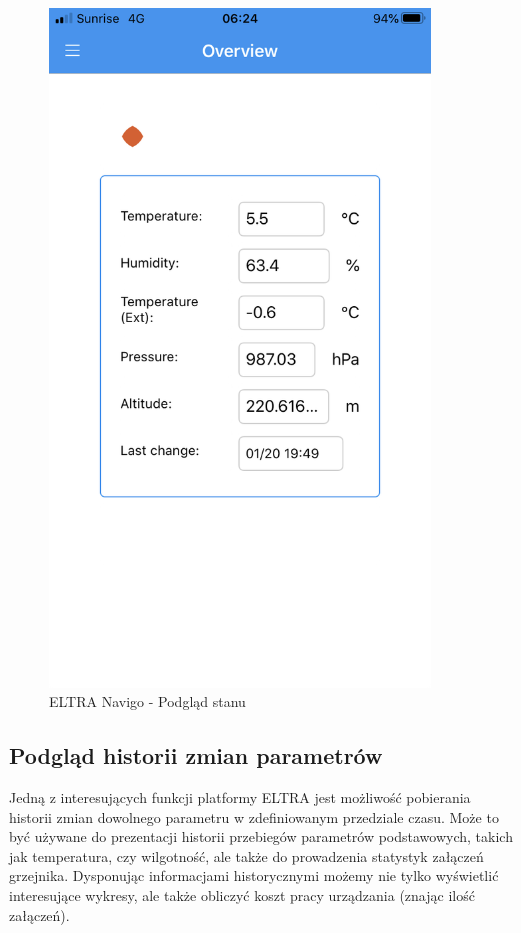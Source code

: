 \documentclass[a4paper,10pt]{article}
\begin{document}
\begin{figure}[H]
\begin{minipage}{0.45\textwidth}
        \includegraphics[width=0.9\textwidth]{navigo_overview.png}
        \caption{ELTRA Navigo - Podgląd stanu}
        \label{rysunek_navigo_overview}
    \end{minipage}
\end{figure}

\subsection{Podgląd historii zmian parametrów}

Jedną z interesujących funkcji platformy ELTRA\cite{EltraWebsite} jest możliwość pobierania historii zmian dowolnego parametru w zdefiniowanym przedziale czasu. Może to być używane do prezentacji historii przebiegów parametrów podstawowych, takich jak temperatura, czy wilgotność, ale także do prowadzenia statystyk załączeń grzejnika. Dysponując informacjami historycznymi możemy nie tylko wyświetlić interesujące wykresy, ale także obliczyć koszt pracy urządzania (znając ilość załączeń). 
\end{document}
